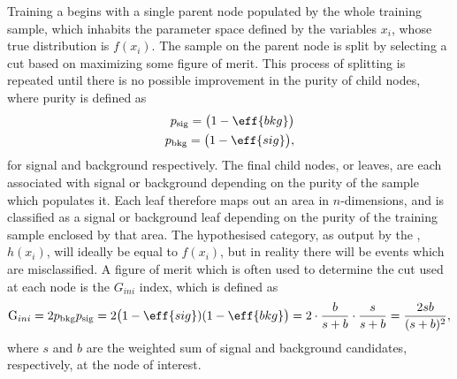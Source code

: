 Training a \DT begins with a single parent node populated by the whole
training sample, which inhabits the parameter space defined by the
variables $x_i$, whose true distribution is $f(x_i)$.
The sample on the parent node is split by selecting a cut based on maximizing some figure of merit.
This process of splitting is repeated until there is no possible improvement in the purity of child
nodes, where purity is defined as
\begin{align}
  p_\mathrm{sig} = \big(1-\eff{bkg}\big)\nonumber\\
  p_\mathrm{bkg} = \big(1-\eff{sig}\big),
\end{align}
for signal and background respectively.
The final child nodes, or leaves, are each associated with signal or background depending on the
purity of the sample which populates it.
Each leaf therefore maps out an area in $n$-dimensions, and is classified as a signal or background leaf
depending on the purity of the training sample enclosed by that area.
The hypothesised category, as output by the \DT, $h(x_i)$, will ideally be equal to $f(x_i)$, but in reality there will be
events which are misclassified.
A figure of merit which is often used to determine the cut used at each node is the $G_{ini}$
index, which is defined as
\begin{equation}
  \mathrm{G}_{ini} = 2p_\mathrm{bkg}p_\mathrm{sig}
  = 2\big(1-\eff{sig})(1-\eff{bkg}\big)
  = 2\cdot\frac{b}{s+b}\cdot\frac{s}{s+b}
  = \frac{2sb}{(s+b)^2},
\end{equation}
where $s$ and $b$ are the weighted sum of signal and background candidates, respectively, at the
node of interest.

